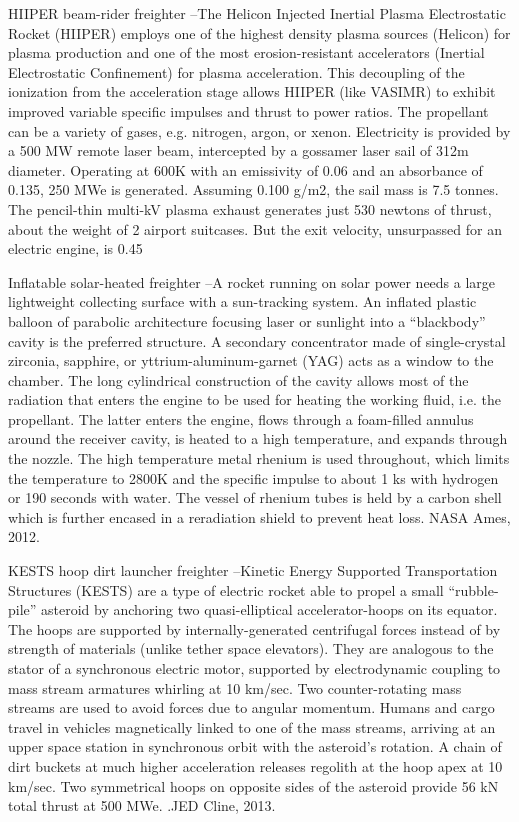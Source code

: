 \documentclass[a4paper]{book}
\begin{document}
HIIPER beam-rider freighter –The Helicon Injected Inertial Plasma Electrostatic Rocket (HIIPER) employs one of the highest density plasma sources (Helicon) for plasma production and one of the most erosion-resistant accelerators (Inertial Electrostatic Confinement) for plasma acceleration. This decoupling of the ionization from the acceleration stage allows HIIPER (like VASIMR) to exhibit improved variable specific impulses and thrust to power ratios. The propellant can be a variety of gases, e.g. nitrogen, argon, or xenon. Electricity is provided by a 500 MW remote laser beam, intercepted by a gossamer laser sail of 312m diameter. Operating at 600K with an emissivity of 0.06 and an absorbance of 0.135, 250 MWe is generated. Assuming 0.100 g/m2, the sail mass is 7.5 tonnes. The pencil-thin multi-kV plasma exhaust generates just 530 newtons of thrust, about the weight of 2 airport suitcases. But the exit velocity, unsurpassed for an electric engine, is 0.45%
 
Inflatable solar-heated freighter –A rocket running on solar power needs a large lightweight collecting surface with a sun-tracking system. An inflated plastic balloon of parabolic architecture focusing laser or sunlight into a “blackbody” cavity is the preferred structure. A secondary concentrator made of single-crystal zirconia, sapphire, or yttrium-aluminum-garnet (YAG) acts as a window to the chamber. The long cylindrical construction of the cavity allows most of the radiation that enters the engine to be used for heating the working fluid, i.e. the propellant. The latter enters the engine, flows through a foam-filled annulus around the receiver cavity, is heated to a high temperature, and expands through the nozzle. The high temperature metal rhenium is used throughout, which limits the temperature to 2800K and the specific impulse to about 1 ks with hydrogen or 190 seconds with water. The vessel of rhenium tubes is held by a carbon shell which is further encased in a reradiation shield to prevent heat loss. NASA Ames, 2012.
 
KESTS hoop dirt launcher freighter –Kinetic Energy Supported Transportation Structures (KESTS) are a type of electric rocket able to propel a small “rubble-pile” asteroid by anchoring two quasi-elliptical accelerator-hoops on its equator. The hoops are supported by internally-generated centrifugal forces instead of by strength of materials (unlike tether space elevators). They are analogous to the stator of a synchronous electric motor, supported by electrodynamic coupling to mass stream armatures whirling at 10 km/sec. Two counter-rotating mass streams are used to avoid forces due to angular momentum. Humans and cargo travel in vehicles magnetically linked to one of the mass streams, arriving at an upper space station in synchronous orbit with the asteroid’s rotation. A chain of dirt buckets at much higher acceleration releases regolith at the hoop apex at 10 km/sec. Two symmetrical hoops on opposite sides of the asteroid provide 56 kN total thrust at 500 MWe. .JED Cline, 2013.
 
\end{document}
